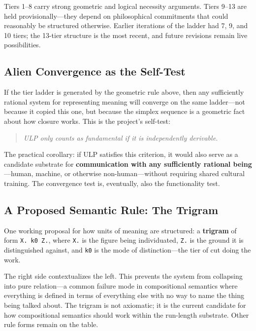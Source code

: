 \documentclass[12pt]{article}
\begin{document}
Tiers 1--8 carry strong geometric and logical necessity arguments. Tiers 9--13 are held provisionally---they depend on philosophical commitments that could reasonably be structured otherwise. Earlier iterations of the ladder had 7, 9, and 10 tiers; the 13-tier structure is the most recent, and future revisions remain live possibilities.

\subsection{Alien Convergence as the Self-Test}
\label{subsec:convergence}

If the tier ladder is generated by the geometric rule above, then any sufficiently rational system for representing meaning will converge on the same ladder---not because it copied this one, but because the simplex sequence is a geometric fact about how closure works. This is the project's self-test:

\begin{quote}
\emph{ULP only counts as fundamental if it is independently derivable.}
\end{quote}

The practical corollary: if ULP satisfies this criterion, it would also serve as a candidate substrate for \textbf{communication with any sufficiently rational being}---human, machine, or otherwise non-human---without requiring shared cultural training. The convergence test is, eventually, also the functionality test.

\subsection{A Proposed Semantic Rule: The Trigram}
\label{subsec:trigram}

One working proposal for how units of meaning are structured: a \textbf{trigram} of form \texttt{X.~k0~Z.}, where \texttt{X.} is the figure being individuated, \texttt{Z.} is the ground it is distinguished against, and \texttt{k0} is the mode of distinction---the tier of cut doing the work.

The right side contextualizes the left. This prevents the system from collapsing into pure relation---a common failure mode in compositional semantics where everything is defined in terms of everything else with no way to name the thing being talked about. The trigram is not axiomatic; it is the current candidate for how compositional semantics should work within the run-length substrate. Other rule forms remain on the table.
\end{document}
